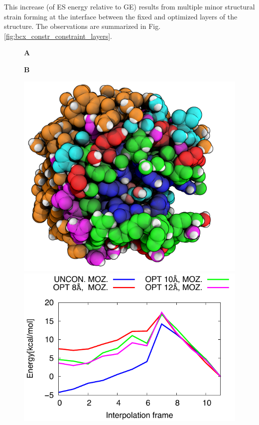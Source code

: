 This increase (of ES energy relative to GE) results from multiple minor structural strain forming at the interface between the fixed and optimized layers of the structure.
The observations are summarized in Fig. \ref{fig:bcx_constr_constraint_layers}.
\begin{figure}[htbp] 
\centering
\begin{minipage}{0.42\linewidth}
\textbf{A}
\end{minipage}
\begin{minipage}{0.42\linewidth}
\textbf{B}
\end{minipage}
\begin{minipage}{0.47\linewidth}
\includegraphics[width=0.95\linewidth]{bcx-constraint-layers-ray-occlusion-2.png}
\end{minipage}
\begin{minipage}{0.51\linewidth}
\includegraphics[width=1.00\linewidth]{bcx-barriers-constraint-layers.pdf}

\end{minipage}
\end{figure}
